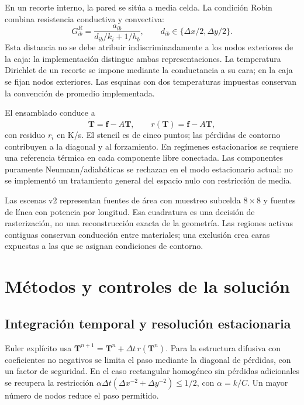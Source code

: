 \documentclass[11pt,a4paper]{article}
\newcommand{\dt}{\Delta t}
\begin{document}
En un recorte interno, la pared se sitúa a media celda. La condición Robin combina resistencia conductiva y convectiva:
\begin{equation}
 G_{ib}^{R}=\frac{a_{ib}}{d_{ib}/k_i+1/h_b},\qquad d_{ib}\in\{\Delta x/2,\Delta y/2\}.
 \label{eq:robin}
\end{equation}
Esta distancia no se debe atribuir indiscriminadamente a los nodos exteriores de la caja: la implementación distingue ambas representaciones. La temperatura Dirichlet de un recorte se impone mediante la conductancia a su cara; en la caja se fijan nodos exteriores. Las esquinas con dos temperaturas impuestas conservan la convención de promedio implementada.

El ensamblado conduce a
\begin{equation}
 \dot{\mathbf T}=\mathbf f-A\mathbf T,\qquad r(\mathbf T)=\mathbf f-A\mathbf T,
 \label{eq:ode}
\end{equation}
con residuo $r_i$ en K/s. El stencil es de cinco puntos; las pérdidas de contorno contribuyen a la diagonal y al forzamiento. En regímenes estacionarios se requiere una referencia térmica en cada componente libre conectada. Las componentes puramente Neumann/adiabáticas se rechazan en el modo estacionario actual: no se implementó un tratamiento general del espacio nulo con restricción de media.

Las escenas v2 representan fuentes de área con muestreo subcelda $8\times8$ y fuentes de línea con potencia por longitud. Esa cuadratura es una decisión de rasterización, no una reconstrucción exacta de la geometría. Las regiones activas contiguas conservan conducción entre materiales; una exclusión crea caras expuestas a las que se asignan condiciones de contorno.

\section{Métodos y controles de la solución}
\subsection{Integración temporal y resolución estacionaria}
Euler explícito usa $\mathbf T^{n+1}=\mathbf T^n+\dt\,r(\mathbf T^n)$. Para la estructura difusiva con coeficientes no negativos se limita el paso mediante la diagonal de pérdidas, con un factor de seguridad. En el caso rectangular homogéneo sin pérdidas adicionales se recupera la restricción $\alpha\dt(\Delta x^{-2}+\Delta y^{-2})\leq1/2$, con $\alpha=k/C$. Un mayor número de nodos reduce el paso permitido.
\end{document}
